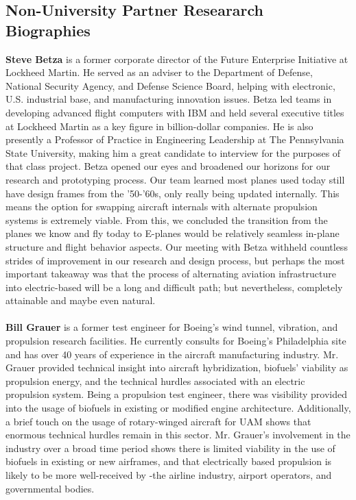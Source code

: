 \documentclass{article}
\begin{document}
\begin{multicols}{2}
\section{Non-University Partner Researarch Biographies}\label{apxC}
\begin{singlespace}
\noindent\textbf{Steve Betza} is a former corporate director of the Future Enterprise Initiative at Lockheed Martin. 
He served as an adviser to the Department of Defense, National Security Agency, and Defense Science Board, helping with electronic, U.S. industrial base, and manufacturing innovation issues. 
Betza led teams in developing advanced flight computers with IBM and held several executive titles at Lockheed Martin as a key figure in billion-dollar companies. 
He is also presently a Professor of Practice in Engineering Leadership at The Pennsylvania State University, making him a great candidate to interview for the purposes of that class project. 
Betza opened our eyes and broadened our horizons for our research and prototyping process. 
Our team learned most planes used today still have design frames from the '50-'60s, only really being updated internally. 
This means the option for swapping aircraft internals with alternate propulsion systems is extremely viable. 
From this, we concluded the transition from the planes we know and fly today to E-planes would be relatively seamless in-plane structure and flight behavior aspects. 
Our meeting with Betza withheld countless strides of improvement in our research and design process, but perhaps the most important takeaway was that the process of alternating aviation infrastructure into electric-based will be a long and difficult path; but nevertheless, completely attainable and maybe even natural.\\~\\
\noindent\textbf{Bill Grauer} is a former test engineer for Boeing's wind tunnel, vibration, and propulsion research facilities.
He currently consults for Boeing’s Philadelphia site and has over 40 years of experience in the aircraft manufacturing industry. 
Mr. Grauer provided technical insight into aircraft hybridization, biofuels' viability as propulsion energy, and the technical hurdles associated with an electric propulsion system. 
Being a propulsion test engineer, there was visibility provided into the usage of biofuels in existing or modified engine architecture. 
Additionally, a brief touch on the usage of rotary-winged aircraft for UAM shows that enormous technical hurdles remain in this sector. 
Mr. Grauer’s involvement in the industry over a broad time period shows there is limited viability in the use of biofuels in existing or new airframes, and that electrically based propulsion is likely to be more well-received by -the airline industry, airport operators, and governmental bodies. 


\end{singlespace}
\end{multicols}
\end{document}
